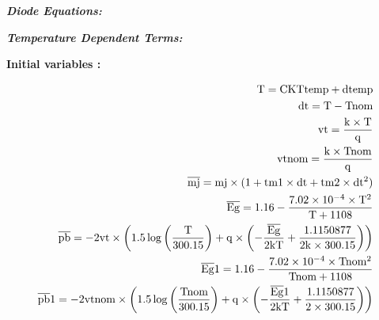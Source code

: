 \textbf{\textit{Diode Equations:}}

\textbf{\textit{Temperature Dependent Terms:}}

{\color{darkblue}\textbf{Initial variables :}}

\begin{eqnarray}
\rm{T = CKTtemp+dtemp} \nonumber \\
\rm{dt = T-Tnom} \nonumber \\
\rm{vt = \frac{k\times T}{q}} \nonumber \\
\rm{vtnom = \frac{k\times Tnom}{q}} \nonumber \\
\rm{\overline{mj} = mj\times (1+tm1\times dt+tm2\times dt^2)}\nonumber\\
\rm{\overline{Eg} = 1.16-\frac{7.02\times 10^{-4}\times T^2}{T+1108}} \nonumber\\
\rm{\overline{pb} = -2vt\times\left(1.5\log\left(\frac{T}{300.15}\right)+q\times \left(-\frac{\overline{Eg}}{2kT} + \frac{1.1150877}{2k\times 300.15}\right)\right)}\nonumber\\
\rm{\overline{Eg}1 = 1.16-\frac{7.02\times 10^{-4}\times Tnom^2}{Tnom+1108}}\nonumber\\
\rm{\overline{pb}1 = -2vtnom\times\left(1.5\log\left(\frac{Tnom}{300.15}\right)+q\times \left(-\frac{\overline{Eg}1}{2kT} + \frac{1.1150877}{2\times 300.15}\right)\right)}\nonumber 
\end{eqnarray}



